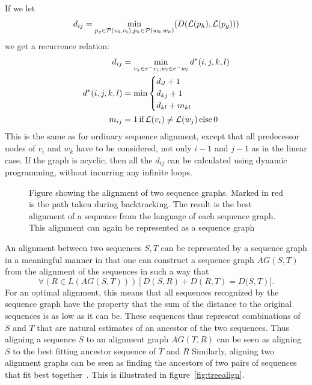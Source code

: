 If we let 
\[
  d_{ij} = \min_{p_g \in \paths(v_0, v_i), p_h \in \paths(w_0, w_k)}(D(\slabel(p_h), \slabel(p_g)))
\]  we get a recurrence relation:
\begin{align*}
  d_{ij} &= \min_{v_k \in \preds{v_i}, w_l \in \preds{w_l}} d^*(i, j, k, l)\\
  d^*(i, j, k, l) &= \min \begin{cases}
    d_{il} + 1\\
    d_{kj} + 1\\
    d_{kl} + m_{kl}\\
    \end{cases}    
    \\
    m_{ij} &= 1\, \text{if}\, \slabel(v_i) \neq \slabel(w_j)\, \text{else}\, 0\\
\end{align*}
This is the same as for ordinary sequence alignment, except that all predecessor nodes of $v_i$ and $w_k$ have to be considered, not only $i-1$ and $j-1$ as in the linear case. If the graph is acyclic, then all the $d_{ij}$ can be calculated using dynamic programming, without incurring any infinite loops.
\begin{figure}
  \begin{tikzpicture}
    
  \end{tikzpicture}
  \caption{Figure showing the alignment of two sequence graphs. Marked in red is the path taken during backtracking. The result is the best alignment of a sequence from the language of each sequence graph. This alignment can again be represented as a sequence graph}
    \label{fig:seqgrapha}
\end{figure}

An alignment between two sequences $S, T$ can be represented by a sequence graph in a meaningful manner in that one can construct a sequence graph $AG(S, T)$ from the alignment of the sequences in such a way that 
\[
\forall (R \in L(AG(S, T)))\left[D(S, R)+D(R, T) =  D(S, T\right)].
\]
For an optimal alignment, this means that all sequences recognized by the sequence graph have the property that the sum of the distance to the original sequences is as low as it can be.
These sequences thus represent combinations of $S$ and $T$ that are natural estimates of an ancestor of the two sequences.
Thus aligning a sequence $S$ to an alignment graph $AG(T, R)$  can be seen as aligning $S$ to the best fitting ancestor sequence of $T$ and $R$
Similarly, aligning two alignment graphs can be seen as finding the ancestors of two pairs of sequences that fit best together~\cite{treealign}. This is illustrated in figure~\ref{fig:treealign}.

